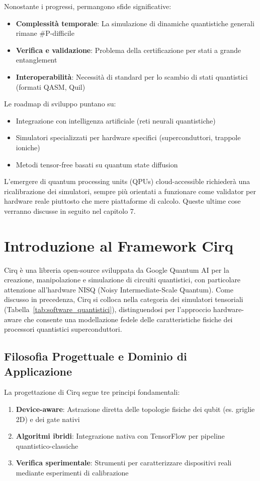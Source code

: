 \documentclass[a4paper,12pt]{report}
\theoremstyle{plain}
\begin{document}
Nonostante i progressi, permangono sfide significative:
\begin{itemize}
    \item \textbf{Complessità temporale}: La simulazione di dinamiche quantistiche generali rimane \#P-difficile
    \item \textbf{Verifica e validazione}: Problema della certificazione per stati a grande entanglement
    \item \textbf{Interoperabilità}: Necessità di standard per lo scambio di stati quantistici (formati QASM, Quil)
\end{itemize}
Le roadmap di sviluppo puntano su:
\begin{itemize}
    \item Integrazione con intelligenza artificiale (reti neurali quantistiche)
    \item Simulatori specializzati per hardware specifici (superconduttori, trappole ioniche)
    \item Metodi tensor-free basati su quantum state diffusion
\end{itemize}
L'emergere di quantum processing units (QPUs) cloud-accessible richiederà una ricalibrazione dei simulatori, sempre più orientati a funzionare come validator per hardware reale piuttosto che mere piattaforme di calcolo.
Queste ultime cose verranno discusse in seguito nel capitolo 7.
\section{Introduzione al Framework Cirq}
\label{sec:cirq-intro}

Cirq è una libreria open-source sviluppata da Google Quantum AI per la creazione, manipolazione e simulazione di circuiti quantistici, con particolare attenzione all'hardware NISQ (Noisy Intermediate-Scale Quantum). Come discusso in precedenza, Cirq si colloca nella categoria dei simulatori tensoriali (Tabella~\ref{tab:software_quantistici}), distinguendosi per l'approccio hardware-aware che consente una modellazione fedele delle caratteristiche fisiche dei processori quantistici superconduttori.

\subsection{Filosofia Progettuale e Dominio di Applicazione}
\label{subsec:cirq-design}

La progettazione di Cirq segue tre principi fondamentali:
\begin{enumerate}
    \item \textbf{Device-aware}: Astrazione diretta delle topologie fisiche dei qubit (es. griglie 2D) e dei gate nativi
    \item \textbf{Algoritmi ibridi}: Integrazione nativa con TensorFlow per pipeline quantistico-classiche
    \item \textbf{Verifica sperimentale}: Strumenti per caratterizzare dispositivi reali mediante esperimenti di calibrazione
\end{enumerate}
\end{document}
